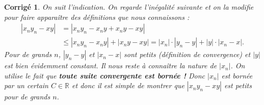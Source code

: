 \documentclass[11pt,french,table]{article}
\theoremstyle{exercice}
\theoremstyle{corrigé}
\newtheorem{corrigé}{Corrigé}
\begin{document}
\vspace{1em}
\begin{corrigé}
   On suit l'indication. On regarde l'inégalité suivante et on la modifie pour faire apparaître des définitions que nous connaissons  : 
    \begin{equation*}
        \begin{aligned}
            |x_ny_n-xy| &= |x_ny_n-x_ny+x_ny-xy| \\ 
        &\leq |x_ny_n-x_ny|+|x_ny-xy|=|x_n|\cdot |y_n-y|+|y|\cdot |x_n-x|.
        \end{aligned}
    \end{equation*}
    Pour de grands $n$, $|y_n-y|$ et $|x_n-x|$ sont petits (définition de convergence) et $|y|$ est bien évidemment constant. 
    Il nous reste à connaître la nature de $|x_n|$. On utilise le fait que \textbf{toute suite convergente est bornée !} Donc $|x_n|$ est bornée par un certain $C\in \mathbb{R}$ et donc il est simple de montrer que $|x_ny_n-xy|$ est petits pour de grands $n$. 
\end{corrigé}
\end{document}
